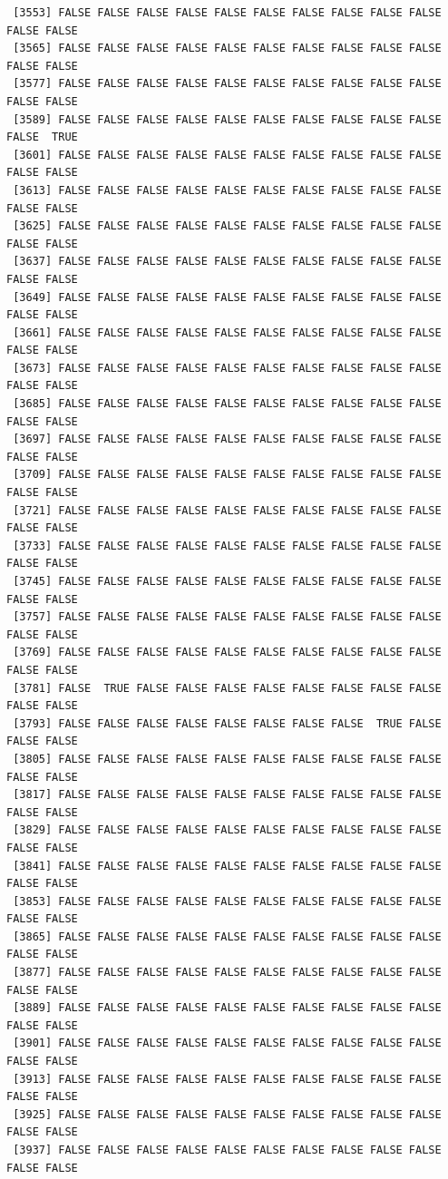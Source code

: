\documentclass[
  a4paper,
  DIV=11,
  numbers=noendperiod]{scrartcl}
\begin{document}
\begin{verbatim}
 [3553] FALSE FALSE FALSE FALSE FALSE FALSE FALSE FALSE FALSE FALSE FALSE FALSE
 [3565] FALSE FALSE FALSE FALSE FALSE FALSE FALSE FALSE FALSE FALSE FALSE FALSE
 [3577] FALSE FALSE FALSE FALSE FALSE FALSE FALSE FALSE FALSE FALSE FALSE FALSE
 [3589] FALSE FALSE FALSE FALSE FALSE FALSE FALSE FALSE FALSE FALSE FALSE  TRUE
 [3601] FALSE FALSE FALSE FALSE FALSE FALSE FALSE FALSE FALSE FALSE FALSE FALSE
 [3613] FALSE FALSE FALSE FALSE FALSE FALSE FALSE FALSE FALSE FALSE FALSE FALSE
 [3625] FALSE FALSE FALSE FALSE FALSE FALSE FALSE FALSE FALSE FALSE FALSE FALSE
 [3637] FALSE FALSE FALSE FALSE FALSE FALSE FALSE FALSE FALSE FALSE FALSE FALSE
 [3649] FALSE FALSE FALSE FALSE FALSE FALSE FALSE FALSE FALSE FALSE FALSE FALSE
 [3661] FALSE FALSE FALSE FALSE FALSE FALSE FALSE FALSE FALSE FALSE FALSE FALSE
 [3673] FALSE FALSE FALSE FALSE FALSE FALSE FALSE FALSE FALSE FALSE FALSE FALSE
 [3685] FALSE FALSE FALSE FALSE FALSE FALSE FALSE FALSE FALSE FALSE FALSE FALSE
 [3697] FALSE FALSE FALSE FALSE FALSE FALSE FALSE FALSE FALSE FALSE FALSE FALSE
 [3709] FALSE FALSE FALSE FALSE FALSE FALSE FALSE FALSE FALSE FALSE FALSE FALSE
 [3721] FALSE FALSE FALSE FALSE FALSE FALSE FALSE FALSE FALSE FALSE FALSE FALSE
 [3733] FALSE FALSE FALSE FALSE FALSE FALSE FALSE FALSE FALSE FALSE FALSE FALSE
 [3745] FALSE FALSE FALSE FALSE FALSE FALSE FALSE FALSE FALSE FALSE FALSE FALSE
 [3757] FALSE FALSE FALSE FALSE FALSE FALSE FALSE FALSE FALSE FALSE FALSE FALSE
 [3769] FALSE FALSE FALSE FALSE FALSE FALSE FALSE FALSE FALSE FALSE FALSE FALSE
 [3781] FALSE  TRUE FALSE FALSE FALSE FALSE FALSE FALSE FALSE FALSE FALSE FALSE
 [3793] FALSE FALSE FALSE FALSE FALSE FALSE FALSE FALSE  TRUE FALSE FALSE FALSE
 [3805] FALSE FALSE FALSE FALSE FALSE FALSE FALSE FALSE FALSE FALSE FALSE FALSE
 [3817] FALSE FALSE FALSE FALSE FALSE FALSE FALSE FALSE FALSE FALSE FALSE FALSE
 [3829] FALSE FALSE FALSE FALSE FALSE FALSE FALSE FALSE FALSE FALSE FALSE FALSE
 [3841] FALSE FALSE FALSE FALSE FALSE FALSE FALSE FALSE FALSE FALSE FALSE FALSE
 [3853] FALSE FALSE FALSE FALSE FALSE FALSE FALSE FALSE FALSE FALSE FALSE FALSE
 [3865] FALSE FALSE FALSE FALSE FALSE FALSE FALSE FALSE FALSE FALSE FALSE FALSE
 [3877] FALSE FALSE FALSE FALSE FALSE FALSE FALSE FALSE FALSE FALSE FALSE FALSE
 [3889] FALSE FALSE FALSE FALSE FALSE FALSE FALSE FALSE FALSE FALSE FALSE FALSE
 [3901] FALSE FALSE FALSE FALSE FALSE FALSE FALSE FALSE FALSE FALSE FALSE FALSE
 [3913] FALSE FALSE FALSE FALSE FALSE FALSE FALSE FALSE FALSE FALSE FALSE FALSE
 [3925] FALSE FALSE FALSE FALSE FALSE FALSE FALSE FALSE FALSE FALSE FALSE FALSE
 [3937] FALSE FALSE FALSE FALSE FALSE FALSE FALSE FALSE FALSE FALSE FALSE FALSE

\end{verbatim}
\end{document}
